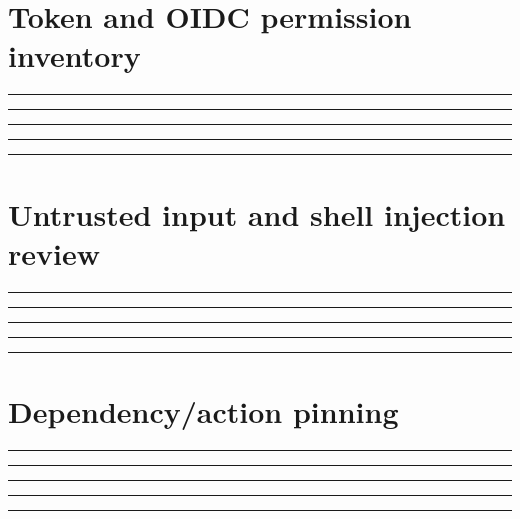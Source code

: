 \documentclass[11pt,letterpaper]{article}
\begin{document}
\section{Token and OIDC permission inventory}
\vspace{2mm}
\noindent\rule{0.93\linewidth}{0.4pt}\par\vspace{13pt}
\noindent\rule{0.93\linewidth}{0.4pt}\par\vspace{13pt}
\noindent\rule{0.93\linewidth}{0.4pt}\par\vspace{13pt}
\noindent\rule{0.93\linewidth}{0.4pt}\par\vspace{13pt}
\noindent\rule{0.93\linewidth}{0.4pt}\par\vspace{13pt}
\section{Untrusted input and shell injection review}
\vspace{2mm}
\noindent\rule{0.93\linewidth}{0.4pt}\par\vspace{13pt}
\noindent\rule{0.93\linewidth}{0.4pt}\par\vspace{13pt}
\noindent\rule{0.93\linewidth}{0.4pt}\par\vspace{13pt}
\noindent\rule{0.93\linewidth}{0.4pt}\par\vspace{13pt}
\noindent\rule{0.93\linewidth}{0.4pt}\par\vspace{13pt}
\section{Dependency/action pinning}
\vspace{2mm}
\noindent\rule{0.93\linewidth}{0.4pt}\par\vspace{13pt}
\noindent\rule{0.93\linewidth}{0.4pt}\par\vspace{13pt}
\noindent\rule{0.93\linewidth}{0.4pt}\par\vspace{13pt}
\noindent\rule{0.93\linewidth}{0.4pt}\par\vspace{13pt}
\noindent\rule{0.93\linewidth}{0.4pt}\par\vspace{13pt}
\end{document}
